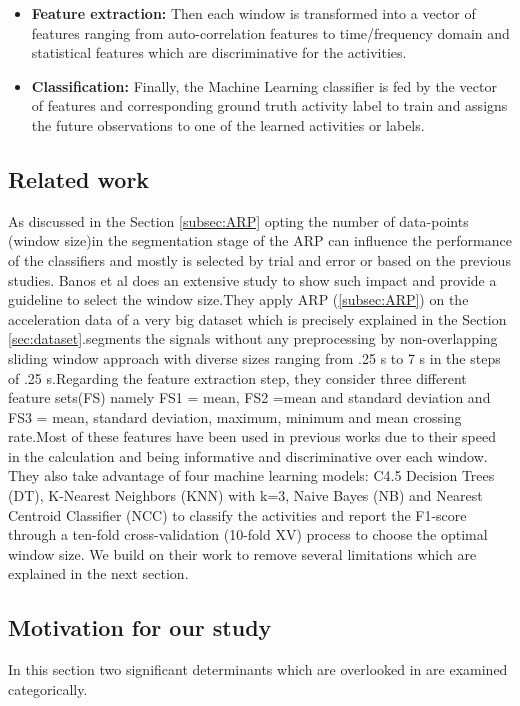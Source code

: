 \begin{itemize}
\item \textbf{Feature extraction:}
Then each window is transformed into a vector of features ranging from auto-correlation features \cite{morris2014recofit} to time/frequency domain and statistical features which are discriminative for the activities.
\item \textbf{Classification:}
Finally, the Machine Learning classifier is fed by the vector of features and corresponding ground truth activity label to train and assigns the future observations to one of the learned activities or labels.


\end{itemize}



\subsection{Related work} \label{sub:theirwork}
As discussed in the Section \ref{subsec:ARP} opting the number of data-points (window size)in the segmentation stage of the ARP can influence the performance of the classifiers and mostly is selected by trial and error or based on the previous studies. Banos et al \cite{banos2014window} does an extensive study to show such impact and provide a guideline to select the window size.They apply ARP (\ref{subsec:ARP}) on the acceleration data of a very big dataset \cite{banos2012benchmark} which is precisely explained in the Section \ref{sec:dataset}.\cite{banos2014window}segments the signals without any preprocessing by non-overlapping sliding window approach with diverse sizes ranging from .25 s to 7 s in the steps of .25 s.Regarding the feature extraction step, they consider three different feature sets(FS) namely FS1 = {mean}, FS2 ={mean and standard deviation} and FS3 = {mean, standard deviation, maximum, minimum and mean crossing rate}.Most of these features have been used in previous works due to their speed in the calculation and being informative and discriminative over each window. They also take advantage of four machine learning models: C4.5 Decision Trees (DT), K-Nearest Neighbors (KNN) with k=3, Naive Bayes (NB) and Nearest Centroid Classifier (NCC) to classify the activities and report the F1-score through a ten-fold cross-validation (10-fold XV) process to choose the optimal window size. We build on their work to remove several limitations which are explained in the next section.

\subsection{Motivation for our study}
In this section two significant determinants which are overlooked in \cite{banos2014window} are examined categorically.

